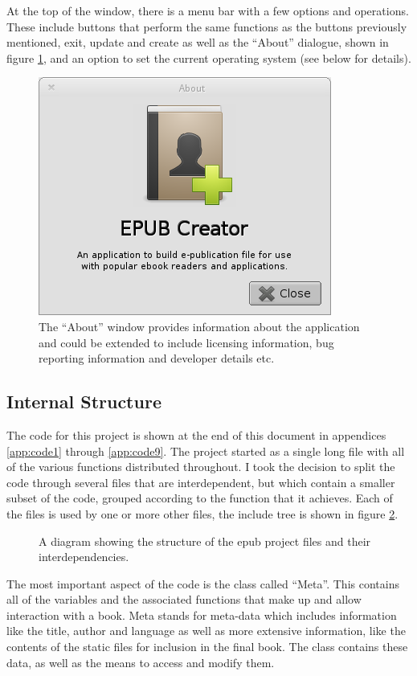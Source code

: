 \documentclass[11pt]{article} %
\newcommand{\inputTikZ}[1]{%
  }
\newcommand{\inputTikZ}[1]{%
    \beginpgfgraphicnamed{#1-external}%
    \endpgfgraphicnamed%
  }
\begin{document}
At the top of the window, there is a menu bar with a few options and operations. These include buttons that perform the same functions as the buttons previously mentioned, exit, update and create as well as the ``About'' dialogue, shown in figure \ref{fig:about}, and an option to set the current operating system (see below for details).
\begin{figure}[ht]
  \centering
  \includegraphics[width=0.35\columnwidth]{about.png}
  \caption{\label{fig:about}The ``About'' window provides information about the application and could be extended to include licensing information, bug reporting information and developer details etc.}
\end{figure}

\subsection{Internal Structure}
The code for this project is shown at the end of this document in appendices \ref{app:code1} through \ref{app:code9}. The project started as a single long file with all of the various functions distributed throughout. I took the decision to split the code through several files that are interdependent, but which contain a smaller subset of the code, grouped according to the function that it achieves. Each of the files is used by one or more other files, the include tree is shown in figure \ref{fig:files}.
\begin{figure}[ht]
  \centering
    \inputTikZ{files}
  \caption{\label{fig:files}A diagram showing the structure of the epub project files and their interdependencies.}
\end{figure}

The most important aspect of the code is the class called ``Meta''. This contains all of the variables and the associated functions that make up and allow interaction with a book. Meta stands for meta-data which includes information like the title, author and language as well as more extensive information, like the contents of the static files for inclusion in the final book. The class contains these data, as well as the means to access and modify them.
\end{document}
